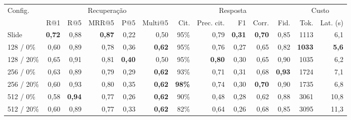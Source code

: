 \begin{tabular}{lrrrrrrrrrrrr}
\toprule
Config. & \multicolumn{5}{c}{Recuperação} & \multicolumn{5}{c}{Resposta} & \multicolumn{2}{c}{Custo} \\
\cmidrule(lr){2-6} \cmidrule(lr){7-11} \cmidrule(lr){12-13}
 & R@1 & R@5 & MRR@5 & P@5 & Multi@5 & Cit. & Prec. cit. & F1 & Corr. & Fid. & Tok. & Lat. (s) \\
\midrule
Slide & \textbf{0{,}72} & 0{,}88 & \textbf{0{,}87} & 0{,}22 & 0{,}50 & 95\% & 0{,}79 & \textbf{0{,}31} & \textbf{0{,}70} & 0{,}85 & 1113 & 6{,}1 \\
128 / 0\% & 0{,}60 & 0{,}89 & 0{,}78 & 0{,}36 & \textbf{0{,}62} & 95\% & 0{,}76 & 0{,}27 & 0{,}65 & 0{,}82 & \textbf{1033} & \textbf{5{,}6} \\
128 / 20\% & 0{,}65 & 0{,}91 & 0{,}81 & \textbf{0{,}40} & 0{,}50 & 95\% & \textbf{0{,}80} & 0{,}30 & 0{,}65 & 0{,}90 & 1035 & 6{,}2 \\
256 / 0\% & 0{,}63 & 0{,}89 & 0{,}79 & 0{,}29 & \textbf{0{,}62} & 93\% & 0{,}71 & 0{,}31 & 0{,}68 & \textbf{0{,}93} & 1724 & 7{,}1 \\
256 / 20\% & 0{,}60 & 0{,}93 & 0{,}80 & 0{,}35 & \textbf{0{,}62} & \textbf{98\%} & 0{,}74 & 0{,}30 & \textbf{0{,}70} & 0{,}90 & 1735 & 6{,}8 \\
512 / 0\% & 0{,}58 & \textbf{0{,}94} & 0{,}77 & 0{,}26 & \textbf{0{,}62} & 90\% & 0{,}48 & 0{,}28 & 0{,}62 & 0{,}88 & 3061 & 10{,}8 \\
512 / 20\% & 0{,}60 & 0{,}89 & 0{,}77 & 0{,}33 & \textbf{0{,}62} & 82\% & 0{,}64 & 0{,}26 & 0{,}68 & 0{,}85 & 3095 & 11{,}3 \\
\bottomrule
\end{tabular}
